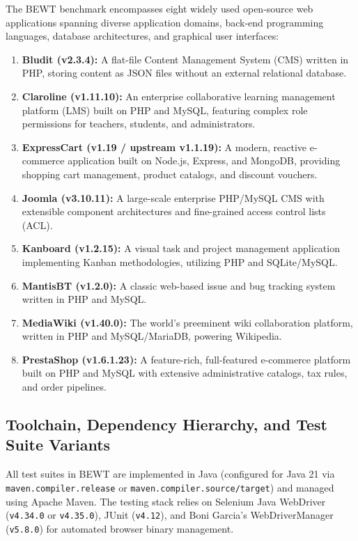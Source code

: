 \documentclass[pdflatex,sn-mathphys-num]{sn-jnl}
\begin{document}
The BEWT benchmark encompasses eight widely used open-source web applications spanning diverse application domains, back-end programming languages, database architectures, and graphical user interfaces:
\begin{enumerate}
    \item \textbf{Bludit (v2.3.4):} A flat-file Content Management System (CMS) written in PHP, storing content as JSON files without an external relational database.
    \item \textbf{Claroline (v1.11.10):} An enterprise collaborative learning management platform (LMS) built on PHP and MySQL, featuring complex role permissions for teachers, students, and administrators.
    \item \textbf{ExpressCart (v1.19 / upstream v1.1.19):} A modern, reactive e-commerce application built on Node.js, Express, and MongoDB, providing shopping cart management, product catalogs, and discount vouchers.
    \item \textbf{Joomla (v3.10.11):} A large-scale enterprise PHP/MySQL CMS with extensible component architectures and fine-grained access control lists (ACL).
    \item \textbf{Kanboard (v1.2.15):} A visual task and project management application implementing Kanban methodologies, utilizing PHP and SQLite/MySQL.
    \item \textbf{MantisBT (v1.2.0):} A classic web-based issue and bug tracking system written in PHP and MySQL.
    \item \textbf{MediaWiki (v1.40.0):} The world's preeminent wiki collaboration platform, written in PHP and MySQL/MariaDB, powering Wikipedia.
    \item \textbf{PrestaShop (v1.6.1.23):} A feature-rich, full-featured e-commerce platform built on PHP and MySQL with extensive administrative catalogs, tax rules, and order pipelines.
\end{enumerate}

\subsection{Toolchain, Dependency Hierarchy, and Test Suite Variants}

All test suites in BEWT are implemented in Java (configured for Java 21 via \texttt{maven.compiler.release} or \texttt{maven.compiler.source/target}) and managed using Apache Maven. The testing stack relies on Selenium Java WebDriver (\texttt{v4.34.0} or \texttt{v4.35.0}), JUnit (\texttt{v4.12}), and Boni Garcia's WebDriverManager (\texttt{v5.8.0}) for automated browser binary management.
\end{document}
